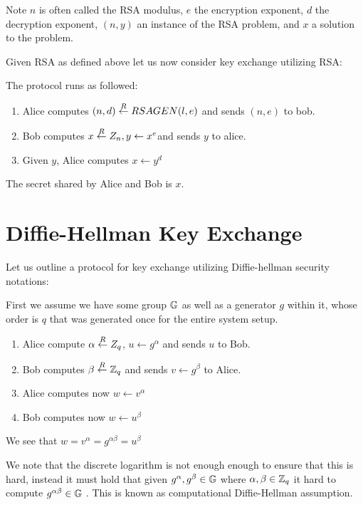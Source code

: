 Note \(n\) is often called the RSA modulus, \(e\) the encryption exponent, \(d\) the decryption exponent, \((n,y)\) an instance of the RSA problem, and \(x\) a solution to the problem.     

Given RSA as defined above let us now consider key exchange utilizing RSA:

The protocol runs as followed: 
\begin{enumerate}
    \item Alice computes \((n,d) \overset{R}{\gets} RSAGEN(l, e) \) and sends \((n,e)\) to bob. 
    \item Bob computes \(x \overset{R}{\gets} Z_n, y \gets x^e\)and sends \(y\) to alice. 
    \item Given \(y\), Alice computes \(x \gets y^d\)      
\end{enumerate}
    The secret shared by Alice and Bob is \(x\). 

\section{Diffie-Hellman Key Exchange}

Let us outline a protocol for key exchange utilizing Diffie-hellman security notations:

First we assume we have some group \(\mathbb{G}\) as well as a generator \(g\) within it, whose order is \(q\) that was generated once for the entire system setup.  
\begin{enumerate}
    \item Alice compute \(\alpha  \overset{R}{\gets} Z_q\), \(u \gets g^\alpha \) and sends \(u\) to Bob. 
    \item Bob computes  \(\beta \overset{R}{\gets} \mathbb{Z}_q\) and sends \(v \gets g^\beta \) to Alice. 
    \item Alice computes now \(w \gets v^\alpha \)
    \item Bob computes now \(w \gets u^\beta \)      
\end{enumerate}
We see that \(w = v^\alpha  = g^{\alpha \beta }= u^\beta \) 

We note that the discrete logarithm is not enough enough to ensure that this is hard, instead it must hold that given \(g^\alpha , g^\beta \in \mathbb{G}\) where \(\alpha ,\beta  \in \mathbb{Z}_q\)  it hard to compute \(g^{\alpha \beta } \in \mathbb{G}\) . This is known as computational Diffie-Hellman assumption.

